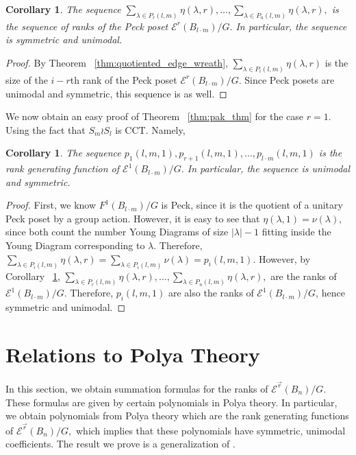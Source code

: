\documentclass[10 pt]{amsart}
\theoremstyle{plain}
\newtheorem{cor}[thm]{Corollary}
\theoremstyle{definition}
\theoremstyle{remark}
\numberwithin{equation}{section}
\renewcommand{\vec}[1]{\overrightarrow{#1}}
\begin{document}
\begin{cor}
\label{cor:unimodal_wreath_r_sequence}
The sequence $\sum_{\lambda \in P_r(l,m)} \eta(\lambda,r),\ldots,\sum_{\lambda \in P_n(l,m)} \eta(\lambda,r),$ is the sequence of ranks of the Peck poset $\mathcal E^r(B_{l\cdot m})/G.$ In particular, the sequence is symmetric and unimodal.
\end{cor}
\begin{proof}
By Theorem ~\ref{thm:quotiented_edge_wreath}, $\sum_{\lambda \in P_i(l,m)} \eta(\lambda,r)$ is the size of the $i-r$th rank of the Peck poset $\mathcal E^r(B_{l\cdot m})/G.$ Since Peck posets are unimodal and symmetric, this sequence is as well.
\end{proof}

We now obtain an easy proof of Theorem ~\ref{thm:pak_thm} for the case $r = 1.$ Using the fact that $S_m\wr S_l$ is CCT. Namely,

\begin{cor}
\label{cor:rank_gen_fn_wreath_1}
The sequence $p_1(l,m,1), p_{r+1}(l,m,1),\ldots, p_{l\cdot m}(l,m,1)$ is the rank generating function of $\mathcal E^1(B_{l\cdot m})/G.$ In particular, the sequence is unimodal and symmetric.
\end{cor}
\begin{proof}
First, we know $F^1(B_{l\cdot m})/G$ is Peck, since it is the quotient of a unitary Peck poset by a group action. However, it is easy to see that $\eta(\lambda,1) = \nu(\lambda),$ since both count the number Young Diagrams of size $|\lambda|-1$ fitting inside the Young Diagram corresponding to $\lambda.$ Therefore, $\sum_{\lambda \in P_i(l,m)} \eta(\lambda,r) = \sum_{\lambda \in P_i(l,m)}\nu(\lambda) = p_i(l,m,1).$ However, by Corollary ~\ref{cor:unimodal_wreath_r_sequence}, $\sum_{\lambda \in P_r(l,m)} \eta(\lambda,r),\ldots,\sum_{\lambda \in P_n(l,m)} \eta(\lambda,r),$ are the ranks of $\mathcal E^1(B_{l\cdot m})/G.$ Therefore, $p_i(l,m,1)$ are also the ranks of $\mathcal E^1(B_{l\cdot m})/G$, hence symmetric and unimodal.
\end{proof}







\section{Relations to Polya Theory}
\label{sec:polya}
In this section, we obtain summation formulas for the ranks of $\mathcal E^{\vec r}(B_n)/G.$ These formulas are given by certain polynomials in Polya theory. In particular, we obtain polynomials from Polya theory which are the rank generating functions of $\mathcal E^{\vec r}(B_n)/G,$ which implies that these polynomials have symmetric, unimodal coefficients. The result we prove is a generalization of \cite[Corollary 7.16]{algebraic_stanley}. 
\end{document}
